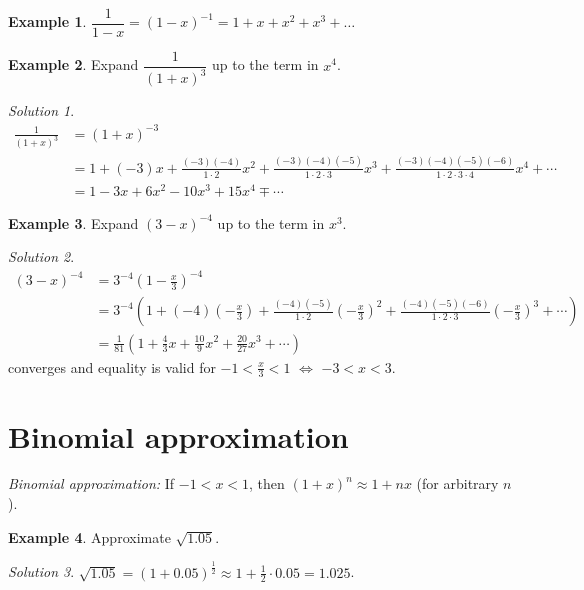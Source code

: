\documentclass[
  12pt,
  oneside]{book}
\theoremstyle{definition}
\theoremstyle{definition}
\newtheorem{example}{Example}[chapter]
\theoremstyle{definition}
\theoremstyle{definition}
\theoremstyle{remark}
\newtheorem*{solution}{Solution}
\begin{document}
\begin{example}
\(\dfrac{1}{1-x} = (1-x)^{-1} = 1+x+x^2+x^3+\dots\)
\end{example}

\begin{example}
Expand \(\dfrac{1}{(1+x)^3}\) up to the term in \(x^4\).
\end{example}

\begin{solution}
\begin{align*}
\frac{1}{(1+x)^3} &= (1+x)^{-3}\\
&= 1+(-3)x+\frac{(-3)(-4)}{1\cdot 2}x^2 + \frac{(-3)(-4)(-5)}{1\cdot 2\cdot 3}x^3 + \frac{(-3)(-4)(-5)(-6)}{1\cdot 2\cdot 3\cdot 4}x^4 + \cdots\\
&=1-3x+6x^2-10x^3+15x^4 \mp \cdots
\end{align*}
\end{solution}

\begin{example}
Expand \((3-x)^{-4}\) up to the term in \(x^3\).
\end{example}

\begin{solution}
\begin{align*}
(3-x)^{-4} &= 3^{-4}\left(1-\frac{x}{3}\right)^{-4}\\
&= 3^{-4}\left(1+(-4)\left(-\frac{x}{3}\right)
+\frac{(-4)(-5)}{1\cdot 2}\left(-\frac{x}{3}\right)^2 + \frac{(-4)(-5)(-6)}{1\cdot 2\cdot 3}\left(-\frac{x}{3}\right)^3+\cdots\right)\\
&= \frac{1}{81}\left(1+\frac{4}{3}x+\frac{10}{9}x^2+\frac{20}{27}x^3+\cdots\right)
\end{align*}
converges and equality is valid for \(-1<\frac{x}{3}<1\) \(\iff\) \(-3<x<3\).
\end{solution}

\section{Binomial approximation}\label{binomial-approximation}

\emph{Binomial approximation:} If \(-1<x<1\), then \((1+x)^n \approx 1+nx\) (for arbitrary \(n\)).

\begin{example}
Approximate \(\sqrt{1.05}\).
\end{example}

\begin{solution}
\(\sqrt{1.05} = (1+0.05)^{\frac12} \approx 1+\frac12\cdot0.05 = 1.025\).
\end{solution}
\end{document}
